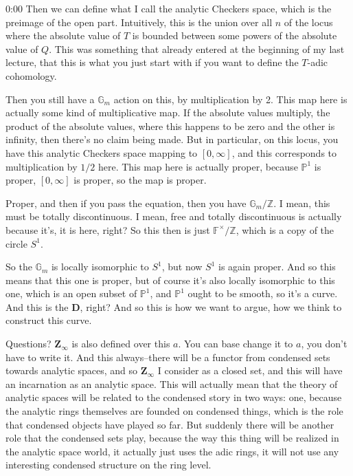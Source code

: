 \begin{unfinished}{0:00}
Then we can define what I call the analytic Checkers space, which is the preimage of the open part. Intuitively, this is the union over all $n$ of the locus where the absolute value of $T$ is bounded between some powers of the absolute value of $Q$. This was something that already entered at the beginning of my last lecture, that this is what you just start with if you want to define the $T$-adic cohomology.

Then you still have a $\mathbb{G}_m$ action on this, by multiplication by 2. This map here is actually some kind of multiplicative map. If the absolute values multiply, the product of the absolute values, where this happens to be zero and the other is infinity, then there's no claim being made. But in particular, on this locus, you have this analytic Checkers space mapping to $[0,\infty]$, and this corresponds to multiplication by $1/2$ here. This map here is actually proper, because $\mathbb{P}^1$ is proper, $[0,\infty]$ is proper, so the map is proper.

Proper, and then if you pass the equation, then you have $\mathbb{G}_m / \mathbb{Z}$. I mean, this must be totally discontinuous. I mean, free and totally discontinuous is actually because it's, it is here, right? So this then is just $\mathbb{F}^\times / \mathbb{Z}$, which is a copy of the circle $S^1$. 

So the $\mathbb{G}_m$ is locally isomorphic to $S^1$, but now $S^1$ is again proper. And so this means that this one is proper, but of course it's also locally isomorphic to this one, which is an open subset of $\mathbb{P}^1$, and $\mathbb{P}^1$ ought to be smooth, so it's a curve. And this is the $\mathbf{D}$, right? And so this is how we want to argue, how we think to construct this curve.

Questions? $\mathbf{Z}_\infty$ is also defined over this $a$. You can base change it to $a$, you don't have to write it. And this always--there will be a functor from condensed sets towards analytic spaces, and so $\mathbf{Z}_\infty$ I consider as a closed set, and this will have an incarnation as an analytic space. This will actually mean that the theory of analytic spaces will be related to the condensed story in two ways: one, because the analytic rings themselves are founded on condensed things, which is the role that condensed objects have played so far. But suddenly there will be another role that the condensed sets play, because the way this thing will be realized in the analytic space world, it actually just uses the adic rings, it will not use any interesting condensed structure on the ring level.

\end{unfinished}